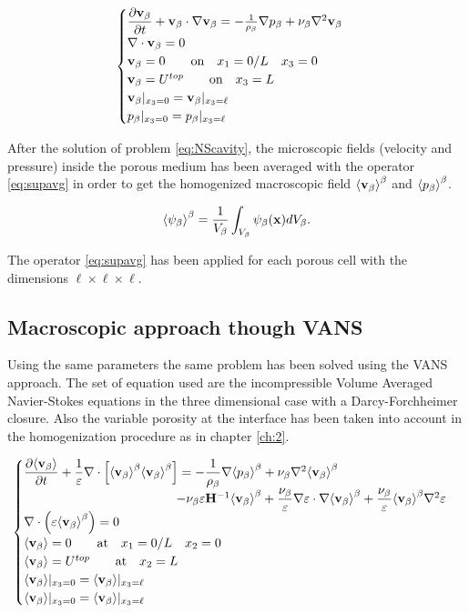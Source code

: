 \begin{eqnarray}
\begin{cases}
\dfrac{\partial \textbf{v}_{\beta}}{\partial t} + \textbf{v}_{\beta} \cdot \nabla \textbf{v}_{\beta} = -\frac{1}{\rho_{\beta}} \nabla p_{\beta} + \nu_{\beta} \nabla^2  \textbf{v}_{\beta} \\
\nabla \cdot \textbf{v}_{\beta} = 0\\
\textbf{v}_{\beta} = 0 \qquad \text{on} \quad x_1 = 0/L \quad x_3 = 0 \\
\textbf{v}_{\beta} = U^{top} \qquad \text{on} \quad x_3 = L\\
\textbf{v}_{\beta}|_{x_3 = 0} = \textbf{v}_{\beta}|_{x_3 = \ell}  \\
p_{\beta}|_{x_3 = 0} = p_{\beta}|_{x_3 = \ell}
\end{cases}
\label{eq:NScavity}
\end{eqnarray}

After the solution of problem \eqref{eq:NScavity}, the microscopic fields (velocity and pressure) inside the porous medium has been averaged with the operator \ref{eq:supavg} in order to get the homogenized macroscopic field ${\left< \textbf{v}_{\beta} \right>}^{\beta}$ and ${\left< p_{\beta} \right>}^{\beta}$.

\begin{equation}
	{\left< \psi_{\beta} \right>}^{\beta} = \dfrac{1}{V_\beta} \int_{V_\beta} \psi_\beta (\mathbf{x}) d V_\beta.
	\label{eq:supavg}
\end{equation}

The operator \eqref{eq:supavg} has been applied for each porous cell with the dimensions $\ell \times \ell \times \ell$.


\subsection{Macroscopic approach though VANS}
Using the same parameters the same problem has been solved using the VANS approach.
The set of equation used are the incompressible Volume Averaged Navier-Stokes equations in the three dimensional case with a Darcy-Forchheimer closure.
Also the variable porosity at the interface has been taken into account in the homogenization procedure as in chapter \ref{ch:2}.

\begin{eqnarray}
\begin{cases}
\dfrac{\partial {\left< \textbf{v}_{\beta} \right>}}{\partial t} + \dfrac{1}{\varepsilon} \nabla \cdot \left[  {\left< \textbf{v}_{\beta} \right>}^{\beta}  {\left< \textbf{v}_{\beta} \right>}^{\beta} \right] = -\dfrac{1}{\rho_{\beta}} \nabla {\left< p_{\beta}\right>}^{\beta} + \nu_{\beta} \nabla^2 {\left< \textbf{v}_{\beta} \right>}^{\beta} \\ 
\qquad \qquad \qquad \qquad \qquad \qquad- \nu_{\beta} \varepsilon \mathbf{H}^{-1} {\left< \textbf{v}_{\beta} \right>}^{\beta} +\dfrac{\nu_{\beta}}{\varepsilon} \nabla \varepsilon \cdot \nabla {\left< \textbf{v}_{\beta} \right>}^{\beta} + \dfrac{\nu_{\beta}}{\varepsilon} {\left< \textbf{v}_{\beta} \right>}^{\beta} \nabla^2 \varepsilon \\
\nabla \cdot \left(\varepsilon {\left< \textbf{v}_{\beta} \right>}^{\beta} \right) = 0\\
{\left< \textbf{v}_{\beta} \right>} = 0 \qquad \textrm{at} \quad x_1 = 0/L \quad x_2 = 0\\
{\left< \textbf{v}_{\beta} \right>} = U^{top} \qquad \textrm{at} \quad x_2 = L\\
{\left< \textbf{v}_{\beta} \right>}|_{x_3 = 0} = {\left< \textbf{v}_{\beta} \right>}|_{x_3 = \ell} \\
{\left< \textbf{v}_{\beta} \right>}|_{x_3 = 0} = {\left< \textbf{v}_{\beta} \right>}|_{x_3 = \ell}
\label{eq:vans_cav}
\end{cases}
\end{eqnarray}

